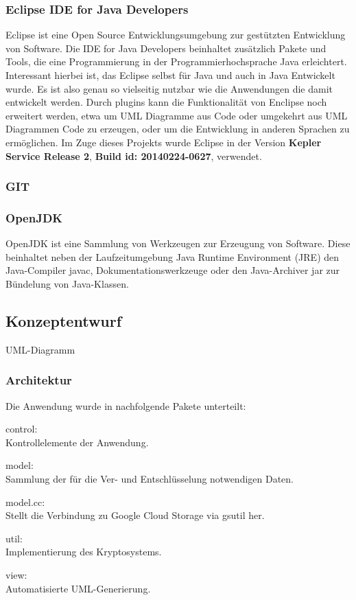 \documentclass[12pt,a4paper,bibliography=totocnumbered,listof=totocnumbered]{scrartcl}
\begin{document}
\subsubsection{Eclipse IDE for Java Developers}
Eclipse ist eine Open Source Entwicklungsumgebung zur gestützten Entwicklung von Software. Die IDE for Java Developers beinhaltet zusätzlich Pakete und Tools, die eine Programmierung in der Programmierhochsprache Java erleichtert. Interessant hierbei ist, das Eclipse selbst für Java und auch in Java Entwickelt wurde. Es ist also genau so vielseitig nutzbar wie die Anwendungen die damit entwickelt werden. Durch plugins kann die Funktionalität von Enclipse noch erweitert werden, etwa um UML Diagramme aus Code oder umgekehrt aus UML Diagrammen Code zu erzeugen, oder um die Entwicklung in anderen Sprachen zu ermöglichen. Im Zuge dieses Projekts wurde Eclipse in der Version \textbf{Kepler Service Release 2}, \textbf{Build id: 20140224-0627}, verwendet.

\subsubsection{GIT}
\subsubsection{OpenJDK}
OpenJDK ist eine Sammlung von Werkzeugen zur Erzeugung von Software. Diese beinhaltet neben der Laufzeitumgebung Java Runtime Environment (JRE) den Java-Compiler javac, Dokumentationswerkzeuge oder den Java-Archiver jar zur Bündelung von Java-Klassen.
\subsection{Konzeptentwurf}
UML-Diagramm
\subsubsection{Architektur}
Die Anwendung wurde in nachfolgende Pakete unterteilt:
\begin{compactitem}
	\item control:\\
Kontrollelemente der Anwendung.
	\item model:\\
Sammlung der für die Ver- und Entschlüsselung notwendigen Daten.
	\item model.cc:\\
Stellt die Verbindung zu Google Cloud Storage via gsutil her.
	\item util:\\
Implementierung des Kryptosystems.
	\item view:\\
Automatisierte UML-Generierung.
\end{compactitem}
\end{document}
